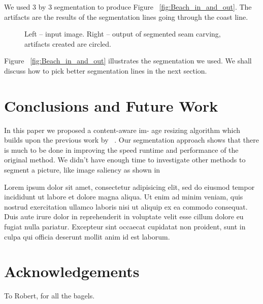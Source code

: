 \documentclass[conference]{acmsiggraph}
\begin{document}
We used 3 by 3 segmentation to produce Figure ~\ref{fig:Beach_in_and_out}. The artifacts are the results of the segmentation lines going through the coast line.


\begin{figure}[ht]       
    \caption{Left -- input image. Right -- output of segmented seam carving, artifacts created are circled.}
    \label{fig:Beach_lines}
\end{figure}

Figure ~\ref{fig:Beach_in_and_out} illustrates the segmentation we used. We shall discuss how to pick better segmentation lines in the next section.


\section{Conclusions and Future Work}

In this paper we proposed a content-aware im-
age resizing algorithm which builds upon the previous work by ~\cite{Avidan2007}. Our segmentation approach shows that there is much to be done in improving the speed runtime and performance of the original method. We didn't have enough time to investigate other methods to segment a picture, like image saliency as shown in  

Lorem ipsum dolor sit amet, consectetur adipisicing elit, sed do
eiusmod tempor incididunt ut labore et dolore magna aliqua. Ut enim ad
minim veniam, quis nostrud exercitation ullamco laboris nisi ut
aliquip ex ea commodo consequat. Duis aute irure dolor in
reprehenderit in voluptate velit esse cillum dolore eu fugiat nulla
pariatur. Excepteur sint occaecat cupidatat non proident, sunt in
culpa qui officia deserunt mollit anim id est laborum.

\section*{Acknowledgements}

To Robert, for all the bagels.



\end{document}
